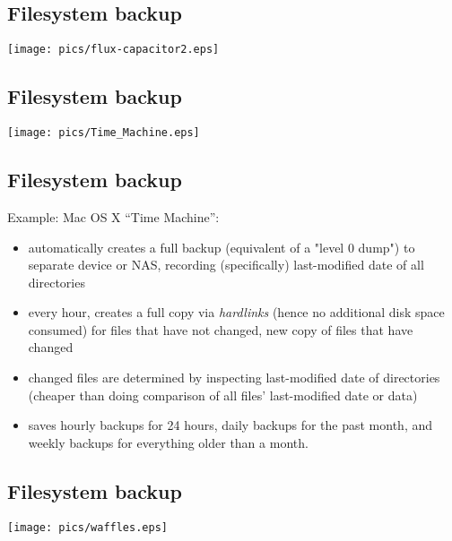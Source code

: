 \documentclass[xga]{xdvislides}
\begin{document}
\subsection{Filesystem backup}
\vspace*{\fill}
\begin{center}
	\texttt{[image: pics/flux-capacitor2.eps]}
\end{center}
\vspace*{\fill}

\subsection{Filesystem backup}
\vspace*{\fill}
\begin{center}
	\texttt{[image: pics/Time\_Machine.eps]}
\end{center}
\vspace*{\fill}


\subsection{Filesystem backup}
Example: Mac OS X ``Time Machine'':
\begin{itemize}
	\item automatically creates a full backup (equivalent of a "level 0 dump")
		to separate device or NAS, recording (specifically) last-modified date
		of all directories
	\item every hour, creates a full copy via {\em hardlinks} (hence no
		additional disk space consumed) for files that have not changed,
		new copy of files that have changed
		\item changed files are determined by inspecting last-modified date of
			directories (cheaper than doing comparison of all files'
			last-modified date or data)
	\item saves hourly backups for 24 hours, daily backups for
		the past month, and weekly backups for everything older than a month.
\end{itemize}

\subsection{Filesystem backup}
\vspace*{\fill}
\begin{center}
	\texttt{[image: pics/waffles.eps]}
\end{center}
\vspace*{\fill}
\end{document}
